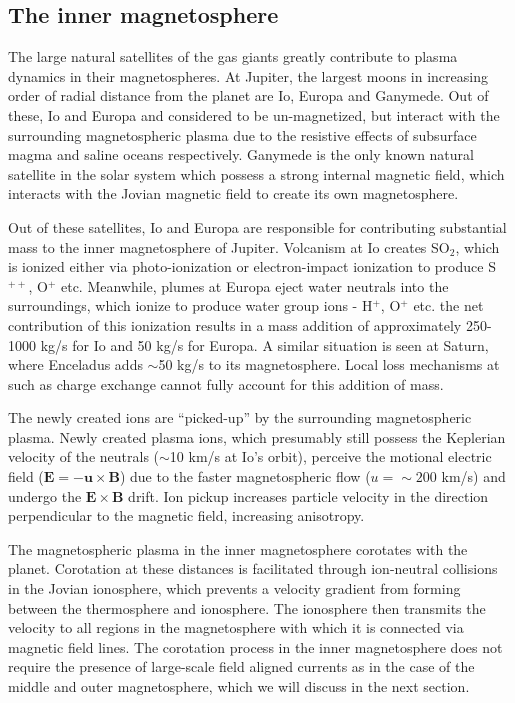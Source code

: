 \subsection{The inner magnetosphere}
The large natural satellites of the gas giants greatly contribute to plasma dynamics in their magnetospheres. At Jupiter, the largest moons in increasing order of radial distance from the planet are Io, Europa and Ganymede. Out of these, Io and Europa and considered to be un-magnetized, but interact with the surrounding magnetospheric plasma due to the resistive effects of subsurface magma and saline oceans respectively. Ganymede is the only known natural satellite in the solar system which possess a strong internal magnetic field, which interacts with the Jovian magnetic field to create its own magnetosphere. 

Out of these satellites, Io and Europa are responsible for contributing substantial mass to the inner magnetosphere of Jupiter. Volcanism at Io creates SO$_2$, which is ionized either via photo-ionization or electron-impact ionization to produce S$^{++}$, O$^+$ etc. Meanwhile, plumes at Europa eject water neutrals into the surroundings, which ionize to produce water group ions - H$^+$, O$^+$ etc. the net contribution of this ionization results in a mass addition of approximately 250-1000 kg/s for Io and 50 kg/s for Europa. A similar situation is seen at Saturn, where Enceladus adds $\sim$50 kg/s to its magnetosphere. Local loss mechanisms at such as charge exchange cannot fully account for this addition of mass. 

The newly created ions are ``picked-up'' by the surrounding magnetospheric plasma. Newly created plasma ions, which presumably still possess the Keplerian velocity of the neutrals ($\sim$10 km/s at Io's orbit), perceive the motional electric field ($\mathbf{E} = -\mathbf{u} \times \mathbf{B}$) due to the faster magnetospheric flow ($u=\sim200$ km/s) and undergo the $\mathbf{E} \times \mathbf{B}$ drift. Ion pickup increases particle velocity in the direction perpendicular to the magnetic field, increasing anisotropy. 

The magnetospheric plasma in the inner magnetosphere corotates with the planet. Corotation at these distances is facilitated through ion-neutral collisions in the Jovian ionosphere, which prevents a velocity gradient from forming between the thermosphere and ionosphere. The ionosphere then transmits the velocity to all regions in the magnetosphere with which it is connected via magnetic field lines. The corotation process in the inner magnetosphere does not require the presence of large-scale field aligned currents as in the case of the middle and outer magnetosphere, which we will discuss in the next section. 


